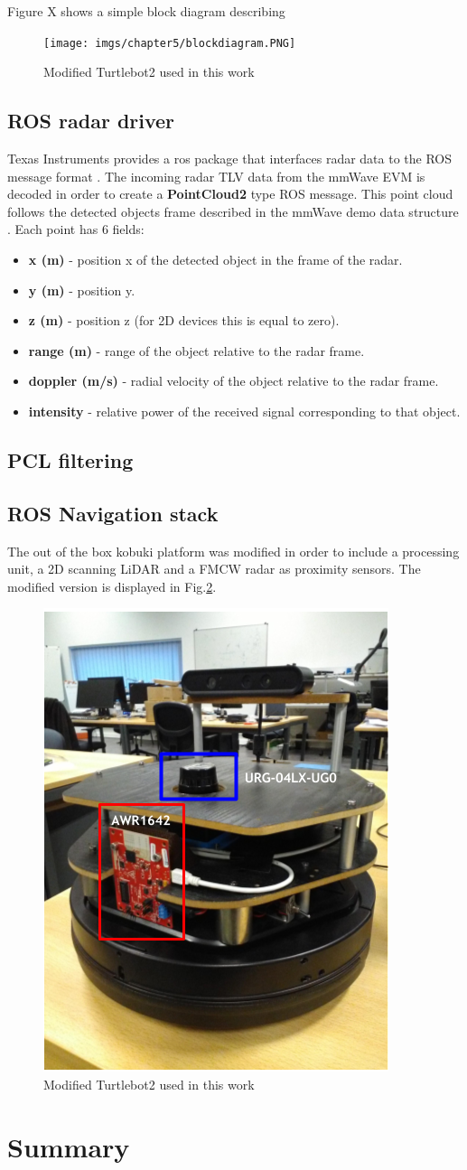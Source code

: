 Figure X shows a simple block diagram describing   
\begin{figure}[h] 
\centerline{\texttt{[image: imgs/chapter5/blockdiagram.PNG]}}
\caption{Modified Turtlebot2 used in this work}
\label{fig::turlebot2}
\end{figure}
\subsection{ROS radar driver}
Texas Instruments provides a ros package that interfaces radar data to the ROS message format \cite{tidriver}. The incoming radar TLV data from the mmWave EVM is decoded in order to create a  \textbf{PointCloud2} type ROS message.
This point cloud follows the detected objects frame described in the mmWave demo data structure \cite{}. 
Each point has 6 fields:
\begin{itemize}
\item \textbf{x (m)} - position x of the detected  object in the frame of the radar.
\item \textbf{y (m)} - position y.
\item \textbf{z (m)} - position z (for 2D devices this is equal to zero).
\item \textbf{range (m)} - range of the object relative to the radar frame.
\item \textbf{doppler (m/s)} - radial velocity of the object relative to the radar frame.
\item \textbf{intensity} - relative power of the received signal corresponding to that object.
\end{itemize}
\subsection{\ac{PCL} filtering}

\subsection{ROS Navigation stack}
The out of the box kobuki platform was modified in order to include a processing unit, a 2D scanning \ac{LiDAR} and a \ac{FMCW} radar as proximity sensors. The modified version is displayed in Fig.\ref{fig::turlebot2}. 
\begin{figure}[h] 
\centerline{\includegraphics [width=0.3 \textwidth]{imgs/chapter4/turtlebot2.PNG}}
\caption{Modified Turtlebot2 used in this work}
\label{fig::turlebot2}
\end{figure}


\section{Summary}   

